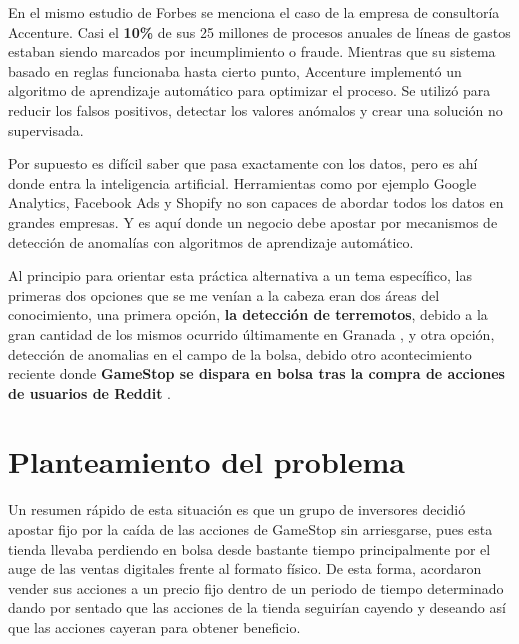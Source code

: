 \documentclass[12pt,twoside]{report}
\begin{document}
En el mismo estudio de Forbes se menciona el caso de la empresa de consultoría Accenture. Casi
el \textbf{10\%} de sus 25 millones de procesos anuales de líneas de gastos estaban siendo marcados por
incumplimiento o fraude. Mientras que su sistema basado en reglas funcionaba hasta cierto punto,
Accenture implementó un algoritmo de aprendizaje automático para optimizar el proceso. Se
utilizó para reducir los falsos positivos, detectar los valores anómalos y crear una solución no
supervisada.

Por supuesto es difícil saber que pasa exactamente con los datos, pero es ahí donde entra la
inteligencia artificial. Herramientas como por ejemplo Google Analytics, Facebook Ads y Shopify no son capaces de
abordar todos los datos en grandes empresas. Y es aquí donde un negocio debe apostar por
mecanismos de detección de anomalías con algoritmos de aprendizaje automático.

Al principio para orientar esta práctica alternativa a un tema específico, las primeras dos opciones que se me venían a la cabeza eran dos áreas del conocimiento, una primera opción, \textbf{la detección de terremotos}, debido a la gran cantidad de los mismos ocurrido últimamente en Granada \cite{terremotos-granada}, y otra opción, detección de anomalias en el campo de la bolsa, debido otro acontecimiento reciente donde \textbf{GameStop se dispara en bolsa tras la compra de acciones de usuarios de Reddit} \cite{reddit-gamestop}.



\section*{Planteamiento del problema}


Un resumen rápido de esta situación \cite{pictoline} es que un grupo de inversores decidió apostar fijo por la caída de las acciones de GameStop sin arriesgarse, pues esta tienda llevaba perdiendo en bolsa desde bastante tiempo principalmente por el auge de las ventas digitales frente al formato físico. De esta forma, acordaron vender sus acciones a un precio fijo dentro de un periodo de tiempo determinado dando por sentado que las acciones de la tienda seguirían cayendo y deseando así que las acciones cayeran para obtener beneficio.
\end{document}
